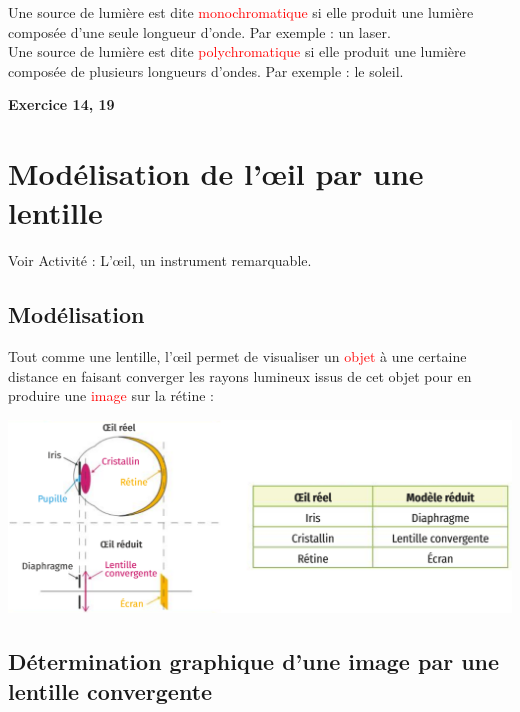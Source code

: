 \begin{tcolorbox}[colback=green!5!white,colframe=green!75!black,title=\textbf{Source monochromatique ou polychromatique:}]
Une source de lumière est dite \textcolor{red}{monochromatique} si elle produit une lumière composée d'une seule longueur d'onde. Par exemple : un laser.\\

Une source de lumière est dite \textcolor{red}{polychromatique} si elle produit une lumière composée de plusieurs longueurs d'ondes. Par exemple : le soleil.
\end{tcolorbox}

\begin{Large}
\end{Large}\textbf{Exercice 14, 19}
\section{Modélisation de l'\oe il par une lentille}
\begin{Large}
\end{Large}
Voir Activité : L'\oe il, un instrument remarquable.

\subsection{Modélisation}
Tout comme une lentille, l'\oe il permet de visualiser un \textcolor{red}{objet} à une certaine distance en faisant converger les rayons lumineux issus de cet objet pour en produire une \textcolor{red}{image} sur la rétine :
\begin{center}
    \includegraphics[scale=0.5]{Images/Cours/Chapitre_4/Modele_oeil.PNG}
\end{center}

\subsection{Détermination graphique d'une image par une lentille convergente}

